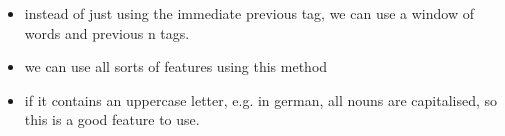 \documentclass[11pt]{article}
\begin{document}
\begin{minipage}[l]{.5\linewidth}
    \begin{figure}[H]
        \centering
    \end{figure}    
\end{minipage}\hfill
\begin{minipage}[r]{.48\linewidth}
    \begin{itemize}
        \item instead of just using the immediate previous tag, we can use a window of words and previous n tags.
    \end{itemize}
\end{minipage}

\begin{minipage}[l]{.5\linewidth}
    \begin{figure}[H]
        \centering
    \end{figure}    
\end{minipage}\hfill
\begin{minipage}[r]{.48\linewidth}
    \begin{itemize}
        \item we can use all sorts of features using this method
        \item if it contains an uppercase letter, e.g. in german, all nouns are capitalised, so this is a good feature to use.
    \end{itemize}
\end{minipage}
\end{document}
